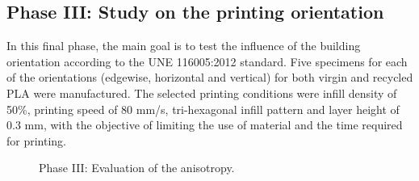\documentclass[]{interact}
\theoremstyle{plain}%
\theoremstyle{definition}
\theoremstyle{remark}
\begin{document}
\hypertarget{phase-iii-study-on-the-printing-orientation}{%
\subsection{Phase III: Study on the printing
orientation}\label{phase-iii-study-on-the-printing-orientation}}

In this final phase, the main goal is to test the influence of the
building orientation according to the UNE 116005:2012
\citep{Garcia-Dominguez2020} standard. Five specimens for each of the
orientations (edgewise, horizontal and vertical) for both virgin and
recycled PLA were manufactured. The selected printing conditions were
infill density of 50\%, printing speed of 80 mm/s, tri-hexagonal infill
pattern and layer height of 0.3 mm, with the objective of limiting the
use of material and the time required for printing.

\begin{figure}[H]
\centering
{}

\caption{Phase III: Evaluation of the anisotropy.}
\end{figure}
\end{document}
